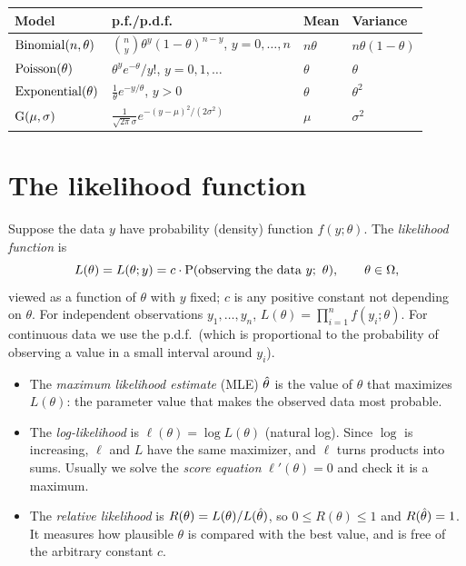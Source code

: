 \begin{center}
\begin{tabular}{llll}
\toprule
Model & p.f./p.d.f.\ & Mean & Variance \\
\midrule
$\operatorname{Binomial}(n,\theta)$ & $\binom{n}{y}\theta^y(1-\theta)^{n-y}$, $y=0,\dots,n$ & $n\theta$ & $n\theta(1-\theta)$\\
$\operatorname{Poisson}(\theta)$ & $\theta^y e^{-\theta}/y!$, $y=0,1,\dots$ & $\theta$ & $\theta$ \\
$\operatorname{Exponential}(\theta)$ & $\frac1\theta e^{-y/\theta}$, $y>0$ & $\theta$ & $\theta^2$ \\
$\operatorname{G}(\mu,\sigma)$ & $\frac{1}{\sqrt{2\pi}\sigma}e^{-(y-\mu)^2/(2\sigma^2)}$ & $\mu$ & $\sigma^2$\\
\bottomrule
\end{tabular}
\end{center}

\section{The likelihood function}

\begin{definition}[Likelihood]
Suppose the data $y$ have probability (density) function $f(y;\theta)$. The
\emph{likelihood function} is
\[
L(\theta) = L(\theta; y) = c \cdot \operatorname{P}(\text{observing the data } y;\ \theta),
\qquad \theta\in\Omega,
\]
viewed as a function of $\theta$ with $y$ fixed; $c$ is any positive constant not depending
on $\theta$. For independent observations $y_1,\dots,y_n$,
$L(\theta) = \prod_{i=1}^n f(y_i;\theta)$. For continuous data we use the p.d.f.\ (which is
proportional to the probability of observing a value in a small interval around $y_i$).
\end{definition}

\begin{definition}
\begin{itemize}
  \item The \emph{maximum likelihood estimate} (MLE) $\hat{\theta}$ is the value of $\theta$
        that maximizes $L(\theta)$: the parameter value that makes the observed data most
        probable.
  \item The \emph{log-likelihood} is $\ell(\theta) = \log L(\theta)$ (natural log). Since
        $\log$ is increasing, $\ell$ and $L$ have the same maximizer, and $\ell$ turns
        products into sums. Usually we solve the \emph{score equation}
        $\ell'(\theta) = 0$ and check it is a maximum.
  \item The \emph{relative likelihood} is $R(\theta) = L(\theta)/L(\hat{\theta})$, so
        $0\le R(\theta)\le 1$ and $R(\hat{\theta})=1$. It measures how plausible $\theta$ is
        compared with the best value, and is free of the arbitrary constant $c$.
\end{itemize}
\end{definition}

